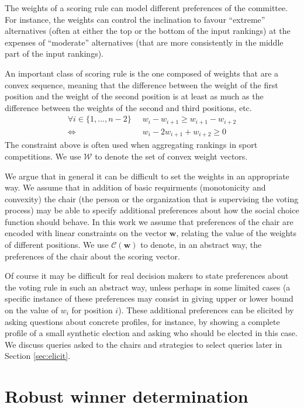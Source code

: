 \documentclass[12pt]{article}
\newcommand{\w}{\textbf{w}}%
\newcommand{\C}{\mathcal{C}}%
\begin{document}
The weights of a scoring rule can model different preferences of the committee. 
For instance, the weights can control the inclination to favour ``extreme'' alternatives (often at either the top or the bottom of the input rankings) at the expenses of ``moderate'' alternatives (that are more consistently in the middle part of the input rankings).

An important class of scoring rule is the one composed of weights that are a convex sequence, meaning that the difference between the weight of the first position and the weight of the second position is at least as much as the difference between the weights of the second and third positions, etc.
\begin{align} \forall i \in \{1,\ldots,n-2\} \;\; & w_i - w_{i+1} \geq w_{i+1}-w_{i+2}  \\
\iff & w_i - 2 w_{i+1} + w_{i+2} \geq 0 \label{eq:convexity}
\end{align}
The constraint above is often used when aggregating rankings in sport competitions.
We use $\mathcal{W}$ to denote the set of convex weight vectors.

We argue that in general it can be difficult to set the weights in an appropriate way.
We assume that in addition of basic requirments (monotonicity and convexity)  the chair (the person or the organization that is supervising the voting process) may be able to specify additional preferences about how the social choice function should behave.
In this work we assume that preferences of the chair are encoded with linear constraints on the vector $\w$, relating the value of the weights of different positions.
We use $\C(\w)$ to denote, in an abstract way, the preferences of the chair about the scoring vector.


Of course it may be difficult for real decision makers to state preferences about the voting rule in such an abstract way, unless perhaps in some limited cases (a specific instance of these preferences may consist in giving upper or lower bound on the value of $w_{i}$ for position $i$).
These additional preferences can be elicited by asking questions about concrete profiles, for instance, by showing a complete profile of a small synthetic election and asking who should be elected in this case.
We discuss queries asked to the chairs and strategies to select queries later in Section \ref{sec:elicit}.

\section[Minimax regret under partial profile and weight information]{
Robust winner determination}
\label{sec:mmr}
\end{document}
